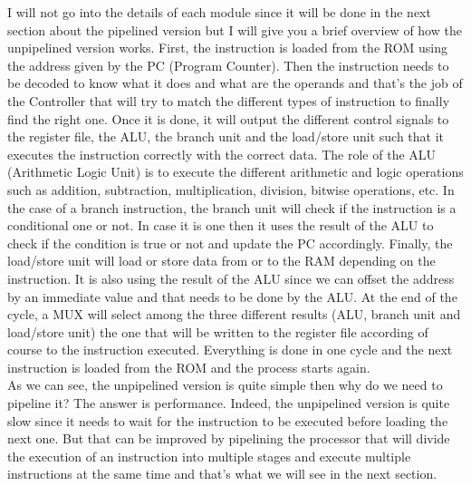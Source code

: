 I will not go into the details of each module since it will be done in the next section about the pipelined version but I will give you a
brief overview of how the unpipelined version works.
First, the instruction is loaded from the ROM using the address given by the PC (Program Counter). Then the instruction needs to be decoded to know 
what it does and what are the operands and that's the job of the Controller that will try to match the different types of instruction to finally 
find the right one. Once it is done, it will output the different control signals to the register file, the ALU, the branch unit and the load/store unit such 
that it executes the instruction correctly with the correct data. The role of the ALU (Arithmetic Logic Unit) is to execute the different arithmetic
and logic operations such as addition, subtraction, multiplication, division, bitwise operations, etc. In the case of a branch instruction, the branch unit
will check if the instruction is a conditional one or not. In case it is one then it uses the result of the ALU to check if the condition is true or not
and update the PC accordingly. Finally, the load/store unit will load or store data from or to the RAM depending on the instruction. It is also using the 
result of the ALU since we can offset the address by an immediate value and that needs to be done by the ALU\@.
At the end of the cycle, a MUX will select among the three different results (ALU, branch unit and load/store unit) the one that will be written to the register file
according of course to the instruction executed.
Everything is done in one cycle and the next instruction is loaded from the ROM and the process starts again. \\

As we can see, the unpipelined version is quite simple then why do we need to pipeline it? The answer is performance. Indeed, the unpipelined version
is quite slow since it needs to wait for the instruction to be executed before loading the next one. But that can be improved by pipelining the processor
that will divide the execution of an instruction into multiple stages and execute multiple instructions at the same time and that's what we will see in the next section.

